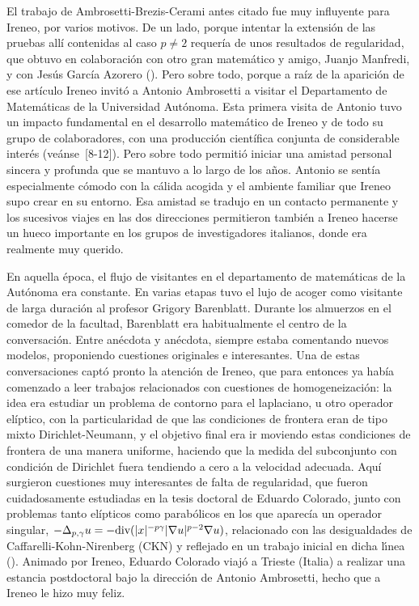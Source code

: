 El trabajo de Ambrosetti-Brezis-Cerami antes citado fue muy influyente para Ireneo, por varios motivos. De un lado, porque intentar la extensi\'on de las pruebas all\'i contenidas al caso $ p \ne 2 $ requer\'ia de unos resultados de regularidad, que obtuvo en colaboraci\'on con otro gran matem\'atico y amigo, Juanjo Manfredi, y con Jes\'us Garc\'ia Azorero {(\cite{Azorero-Manfredi-Peral})}. Pero sobre todo, porque a ra\'iz de la aparici\'on de ese art\'iculo Ireneo invit\'o a Antonio Ambrosetti a visitar el Departamento de Matem\'aticas de la Universidad Aut\'onoma. {Esta primera visita de Antonio tuvo un impacto fundamental en el desarrollo matem\'atico de Ireneo y de todo su grupo de colaboradores, con una producci\'on cient\'ifica conjunta de considerable inter\'es (ve\'anse~[8-12]). Pero sobre todo permiti\'o iniciar una amistad personal sincera y profunda que se mantuvo a lo largo de los a\~nos. Antonio se sent\'ia especialmente c\'omodo con la c\'alida acogida y el ambiente familiar que Ireneo supo crear en su entorno. Esa amistad se tradujo en un contacto permanente y los sucesivos viajes en las dos direcciones permitieron tambi\'en a Ireneo hacerse un hueco importante en los grupos de investigadores italianos, donde era realmente muy querido.}

En aquella \'epoca, el flujo de visitantes en el departamento de matem\'aticas de la Aut\'onoma era constante. En varias etapas tuvo el lujo de acoger como visitante de larga duraci\'on al profesor Grigory Barenblatt. Durante los almuerzos en el comedor de la facultad, Barenblatt era habitualmente el centro de la conversaci\'on. Entre an\'ecdota y an\'ecdota, siempre estaba comentando nuevos modelos, proponiendo cuestiones originales e interesantes. Una de estas conversaciones capt\'o pronto la atenci\'on de Ireneo, que para entonces ya hab\'ia comenzado a leer trabajos relacionados con cuestiones de homogeneizaci\'on: la idea era estudiar un problema de contorno para el laplaciano, u otro operador el\'iptico, con la particularidad de que las condiciones de frontera eran de tipo mixto Dirichlet-Neumann, y el objetivo final era ir moviendo estas condiciones de frontera de una manera uniforme, haciendo que la medida del subconjunto con condici\'on de Dirichlet fuera tendiendo a cero a la velocidad adecuada. Aqu\'i surgieron cuestiones muy interesantes de falta de regularidad, que fueron cuidadosamente estudiadas en la tesis doctoral de Eduardo Colorado, junto con problemas tanto el\'ipticos como parab\'olicos en los que aparec\'ia un operador singular, $ -\Delta_{p,\gamma} u = -\hbox{div}(|x|^{-p\gamma} |\nabla u|^{p-2}\nabla u ) $, relacionado con las desigualdades de Caffarelli-Kohn-Nirenberg (CKN) y reflejado en un  {trabajo inicial} en dicha l\'{\i}nea 
{(\cite{Col-Per2})}. Animado por Ireneo, Eduardo Colorado viaj\'o a Trieste (Italia) a realizar una estancia postdoctoral bajo la direcci\'on de   Antonio Ambrosetti,  hecho que a Ireneo le hizo muy feliz.

